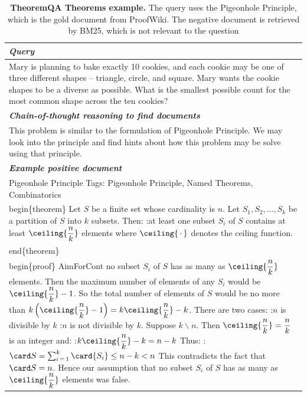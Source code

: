 \begin{table}[ht]
\caption{\textbf{TheoremQA Theorems example.} The query uses the Pigeonhole Principle, which is the gold document from ProofWiki. The negative document is retrieved by BM25, which is not relevant to the question}
\centering
\begin{tabular}{p{13cm}}
\toprule
\textit{\textbf{Query}} \\
\midrule
Mary is planning to bake exactly 10 cookies, and each cookie may be one of three different shapes -- triangle, circle, and square. Mary wants the cookie shapes to be a diverse as possible. What is the smallest possible count for the most common shape across the ten cookies?\\
\midrule
\textit{\textbf{Chain-of-thought reasoning to find documents}} \\
\midrule
This problem is similar to the formulation of Pigeonhole Principle. We may look into the principle and find hints about how this problem may be solve using that principle.\\
\midrule
\textit{\textbf{Example positive document}} \\
\midrule
Pigeonhole Principle Tags: Pigeonhole Principle, Named Theorems, Combinatorics  
\\begin\{theorem\} Let $S$ be a finite set whose cardinality is $n$. Let $S_1, S_2, \ldots, S_k$ be a partition of $S$ into $k$ subsets. Then: :at least one subset $S_i$ of $S$ contains at least $\ceiling{\dfrac n k}$ elements where $\ceiling{\, \cdot \,}$ denotes the ceiling function. \\end\{theorem\}  
\\begin\{proof\} {{AimForCont}} no subset $S_i$ of $S$ has as many as $\ceiling {\dfrac n k}$ elements. 
Then the maximum number of elements of any $S_i$ would be $\ceiling {\dfrac n k} - 1$. 
So the total number of elements of $S$ would be no more than $k \left(\ceiling {\dfrac n k} - 1\right) = k \ceiling {\dfrac n k} - k$. There are two cases: :$n$ is divisible by $k$ :$n$ is not divisible by $k$. 
Suppose $k \backslash n$. Then $\ceiling {\dfrac n k} = \dfrac n k$ is an integer and: :$k \ceiling {\dfrac n k} - k = n - k$ Thus: :$\card S = \sum_{i \mathop = 1}^k \card {S_i} \le n - k < n$ This contradicts the fact that $\card S = n$. 
Hence our assumption that no subset $S_i$ of $S$ has as many as $\ceiling {\dfrac n k}$ elements was false. 

\end{tabular}
\end{table}
